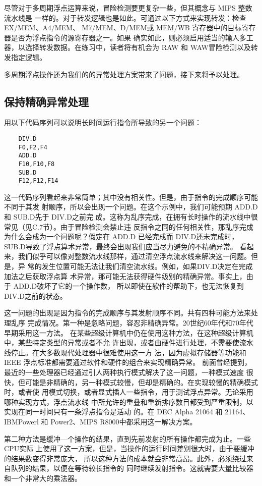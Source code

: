 尽管对于多周期浮点运算来说，冒险检测要更复杂一些，但其概念与 MIPS 整数流水线是
一样的。对于转发逻辑也是如此。可通过以下方式来实现转发：检查 EX/MEM、A4/MEM、
M7/MEM、D/MEM或 MEM/WB 寄存器中的目标寄存器是否为浮点指令的源寄存器之一。如果
确实如此，则必须启用适当的输人多工器，以选择转发数据。在练习中，读者将有机会为 RAW
和 WAW冒险检测以及转发指定逻辑。

多周期浮点操作还为我们的的异常处理方案带来了问题，接下来将予以处理。

\subsection{保持精确异常处理}
用以下代码序列可以说明长时间运行指令所导致的另一个问题：
\begin{verbatim}
    DIV.D
    F0,F2,F4
    ADD.D
    F10,F10,F8
    SUB.D
    F12,F12,F14
\end{verbatim}
这一代码序列看起来非常筒单；其中没有相关性。但是，由于指令的完成顺序可能不同于其发
射顺序，所以会出现一个问题。在这个示例中，我们可能预期 ADD.D 和 SUB.D先于 DIV.D之前完
成。这称为乱序完成，在拥有长时操作的流水线中很常见（见C.7节）。由于冒险检测会禁止违
反指令之同的任何相关性，那乱序完成为什么会成为一个问题呢？假定在 ADD.D 已经完成而
DIV.D还未完成时，SUB.D导致了浮点算术异常，最终会出现我们应当尽力避免的不精确异常。
看起来，我们似乎可以像对整数流水线那样，通过清空浮点流水线来解决这一问题。但是，异
常的发生位置可能无法让我们清空流水线。例如，如果DIV.D决定在完成加法之后获取浮点算
术异常，那可能无法获得硬件级别的精确异常。事实上，由于 ADD.D破坏了它的一个操作数，
所以即使在软件的帮助下，也无法恢复到 DIV.D之前的状态。

这一问题的出现是因为指令的完成顺序与其发射顺序不同。共有四种可能方法来处理乱序
完成情况。第一种是忽略问题，容忍非精确异常。20世纪60年代和70年代早期采用这一方法。
在某些超级计算机中仍在使用这种方法，在这种超级计算机中，某些特定类型的异常或者不允
许出现，或者由硬件进行处理，不需要使流水线停止。在大多数现代处理器中很难使用这一方
法，因为虚拟存储器等功能和 IEEE 浮点标准都需要通过软件和硬件的组合来实现精确异常。
前面曾经提到，最近的一些处理器已经通过引人两种执行模式解决了这一问题，一种模式速度
很快，但可能是非精确的，另一种模式较慢，但却是精确的。在实现较慢的精确模式时，或者使
用模式切换，或者显式插人一些指令，用于测试浮点异常。无论采用哪种实现方式，浮点流水线
中所允许的重叠和重新排序数目都受到严重限制，以实现在同一时间只有一条浮点指令是活动
的。在 DEC Alpha 21064 和 21164、IBMPowerl 和 Power2、MIPS R8000中都采用这一解决方案。

第二种方法是缓冲—个操作的结果，直到先前发射的所有操作都完成为止。一些CPU实际
上使用了这一方案，但是，当操作的运行时间差别很大时，由于要缓冲的结果数变得非常庞大，
所以这种方法的成本就会非常高昂。此外，必须绕过来自队列的结果，以便在等待较长指令的
同时继续发射指令。这就需要大量比较器和一个非常大的乘法器。

